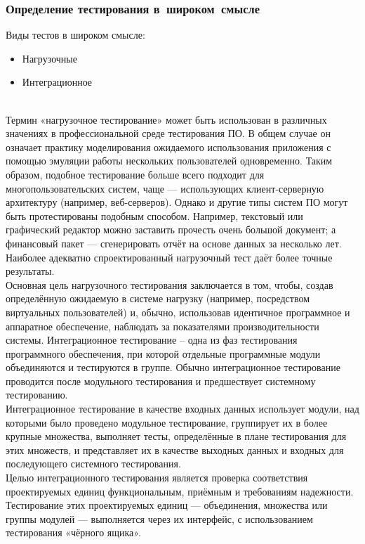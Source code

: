 \documentclass[lecturenotes]{../industrial-development}
\begin{document}
\begin{frame} \frametitle{Определение тестирования в~широком~смысле}
	Виды тестов в широком смысле:
	\begin{itemize}
		\item Нагрузочные
		\item Интеграционное
	\end{itemize}
\end{frame}
\lecturenotes
\\Термин «нагрузочное тестирование» может быть использован в различных значениях в профессиональной среде тестирования ПО. В общем случае он означает практику моделирования ожидаемого использования приложения с помощью эмуляции работы нескольких пользователей одновременно. Таким образом, подобное тестирование больше всего подходит для многопользовательских систем, чаще — использующих клиент-серверную архитектуру (например, веб-серверов). Однако и другие типы систем ПО могут быть протестированы подобным способом. Например, текстовый или графический редактор можно заставить прочесть очень большой документ; а финансовый пакет — сгенерировать отчёт на основе данных за несколько лет. Наиболее адекватно спроектированный нагрузочный тест даёт более точные результаты.\\
Основная цель нагрузочного тестирования заключается в том, чтобы, создав определённую ожидаемую в системе нагрузку (например, посредством виртуальных пользователей) и, обычно, использовав идентичное программное и аппаратное обеспечение, наблюдать за показателями производительности системы. 
Интеграционное тестирование – одна из фаз тестирования программного обеспечения, при которой отдельные программные модули объединяются и тестируются в группе. Обычно интеграционное тестирование проводится после модульного тестирования и предшествует системному тестированию.\\
Интеграционное тестирование в качестве входных данных использует модули, над которыми было проведено модульное тестирование, группирует их в более крупные множества, выполняет тесты, определённые в плане тестирования для этих множеств, и представляет их в качестве выходных данных и входных для последующего системного тестирования.\\ 
Целью интеграционного тестирования является проверка соответствия проектируемых единиц функциональным, приёмным и требованиям надежности. Тестирование этих проектируемых единиц — объединения, множества или группы модулей — выполняется через их интерфейс, с использованием тестирования «чёрного ящика». 
\end{document}
